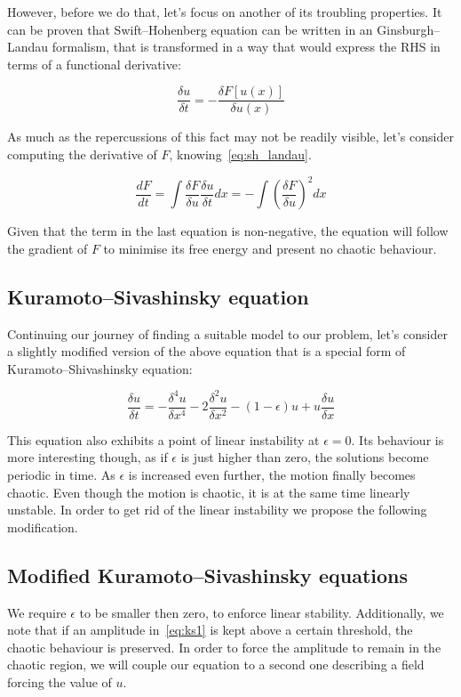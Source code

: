 \documentclass[11pt,a4paper]{article}
\begin{document}
However, before we do that, let's focus on another of its troubling properties.
It can be proven\cite{Schneider96} that Swift--Hohenberg equation can be written in an Ginsburgh--Landau formalism, that is transformed in a way that would express the RHS in terms of a functional derivative:

\begin{equation}\label{eq:sh_landau}
    \frac{\delta u}{\delta t} = - \frac{\delta F[u(x)]}{\delta u(x)}
\end{equation}

As much as the repercussions of this fact may not be readily visible, let's consider computing the derivative of $F$, knowing~\eqref{eq:sh_landau}.

\begin{equation}\label{eq:sh_der}
    \frac{dF}{dt} = \int\frac{\delta F}{\delta u} \frac{\delta u}{\delta t}dx = -\int (\frac{\delta F}{\delta u})^2 dx
\end{equation}

Given that the term in the last equation is non-negative, the equation will follow the gradient of $F$ to minimise its free energy and present no chaotic behaviour.

\subsection{Kuramoto--Sivashinsky equation}
Continuing our journey of finding a suitable model to our problem, let's consider a slightly modified version of the above equation that is a special form of Kuramoto--Shivashinsky\cite{Hayman86} equation:

\begin{equation}\label{eq:ks1}
    \frac{\delta u}{\delta t} = -\frac{\delta^4 u}{\delta x^4} - 2\frac{\delta^2u}{\delta x^2} - (1 - \epsilon)u + u\frac{\delta u}{\delta x}
\end{equation}

This equation also exhibits a point of linear instability at $\epsilon = 0$.
Its behaviour is more interesting though, as if $\epsilon$ is just higher than zero, the solutions become periodic in time.
As $\epsilon$ is increased even further, the motion finally becomes chaotic.
Even though the motion is chaotic, it is at the same time linearly unstable.
In order to get rid of the linear instability we propose the following modification.

\subsection{Modified Kuramoto--Sivashinsky equations}
We require $\epsilon$ to be smaller then zero, to enforce linear stability.
Additionally, we note that if an amplitude in~\eqref{eq:ks1} is kept above a certain threshold, the chaotic behaviour is preserved.
In order to force the amplitude to remain in the chaotic region, we will couple our equation to a second one describing a field forcing the value of $u$.
\end{document}
